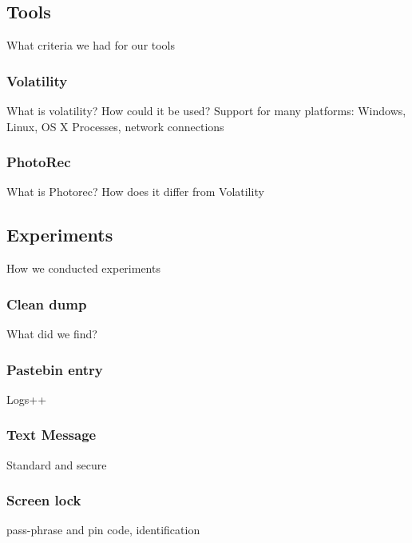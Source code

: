 \subsection{Tools}
What criteria we had for our tools
  \subsubsection{Volatility}
  What is volatility? How could it be used?
  Support for many platforms: Windows, Linux, OS X
  Processes, network connections
  \subsubsection{PhotoRec}
  What is Photorec? How does it differ from Volatility
\subsection{Experiments}
How we conducted experiments
  \subsubsection{Clean dump}
  What did we find?
  \subsubsection{Pastebin entry}
  Logs++
  \subsubsection{Text Message}
  Standard and secure
  \subsubsection{Screen lock}
  pass-phrase and pin code, identification
